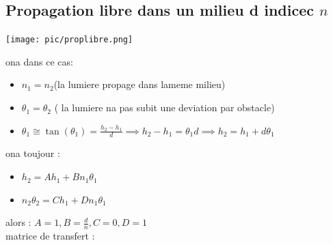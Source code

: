 \documentclass[12pt]{book}
\begin{document}
        \subsection{Propagation libre dans un milieu d indicec $n$}
            \begin{center}
                \texttt{[image: pic/proplibre.png]}
            \end{center}
            ona dans ce cas:
            \begin{itemize}
                \item $n_1 = n_2$(la lumiere propage dans lameme milieu)
                \item $\theta_1 = \theta_2$ ( la lumiere na pas subit une deviation par obstacle)
                \item $\theta_1 \cong \tan(\theta_1) = \frac{h_2 - h_1}{d} \implies h_2 - h_1 = \theta_1d \implies h_2 =h_1 + d\theta_1$ 
            \end{itemize}
            ona toujour :
            \begin{itemize}
                \item $ h_2 = Ah_1 + Bn_1\theta_1$
                \item $ n_2\theta_2 = Ch_1 + Dn_1\theta_1$
            \end{itemize}
            alors : $ A = 1 , B = \frac{d}{n} ,C = 0 , D = 1$ \\ 
            matrice de transfert : 
            \begin{center}
                 \\
            \end{center}
\end{document}

